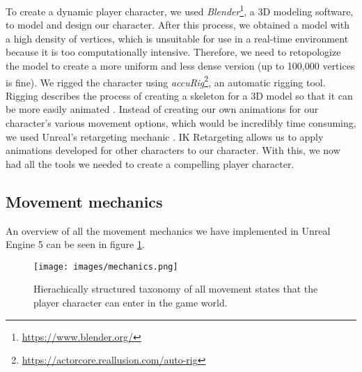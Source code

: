 \documentclass[letterpaper, 10 pt, conference]{ieeeconf}  %
\begin{document}
To create a dynamic player character, we used \textit{Blender}\footnote{\url{https://www.blender.org/}}, a 3D modeling software, to model and design our character.
After this process, we obtained a model with a high density of vertices, which is unsuitable for use in a real-time environment because it is too computationally intensive.
Therefore, we need to retopologize the model to create a more uniform and less dense version (up to 100,000 vertices is fine).
We rigged the character using \textit{accuRig}\footnote{\url{https://actorcore.reallusion.com/auto-rig}}, an automatic rigging tool.
Rigging describes the process of creating a skeleton for a 3D model so that it can be more easily animated \cite{rigging}.
Instead of creating our own animations for our character's various movement options, which would be incredibly time consuming, we used Unreal's retargeting mechanic \cite{retarget}.
IK Retargeting allows us to apply animations developed for other characters to our character.
With this, we now had all the tools we needed to create a compelling player character.

\subsection{Movement mechanics}

An overview of all the movement mechanics we have implemented in Unreal Engine 5 can be seen in figure \ref{fig:mechanics}.

\begin{figure}[!ht]
    \caption{Hierachically structured taxonomy of all movement states that the player character can enter in the game world.
    }
    \centering
    \texttt{[image: images/mechanics.png]}
    \label{fig:mechanics}
\end{figure}
\end{document}
